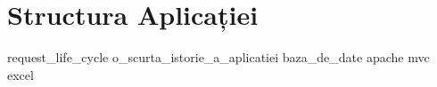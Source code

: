 \chapter{Structura Aplicației}
{request_life_cycle}
{o_scurta_istorie_a_aplicatiei}
{baza_de_date}
{apache}
{mvc}
{excel}